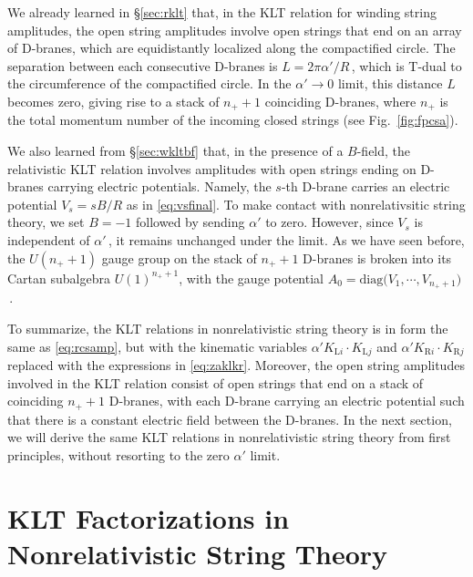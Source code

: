 \documentclass[11pt]{article}
\begin{document}
We already learned in \S\ref{sec:rklt} that, in the KLT relation for winding string amplitudes, the open string amplitudes involve open strings that end on an array of D-branes, which are equidistantly localized along the compactified circle. The separation between each consecutive D-branes is $L = 2 \pi \alpha' / R$\,, which is T-dual to the circumference of the compactified circle. In the $\alpha' \rightarrow 0$ limit, this distance $L$ becomes zero, giving rise to a stack of $n_+ + 1$ coinciding D-branes, where $n_+$ is the total momentum number of the incoming closed strings (see Fig.~\ref{fig:fpcsa}). 

We also learned from \S\ref{sec:wkltbf} that, in the presence of a $B$-field, the relativistic KLT relation involves amplitudes with open strings ending on D-branes carrying electric potentials. Namely, the $s$-th D-brane carries an electric potential $V_s = s B / R$ as in \eqref{eq:vsfinal}. 
%
To make contact with nonrelativsitic string theory, we set $B = -1$ followed by sending $\alpha'$ to zero. However, since $V_s$ is independent of $\alpha'$\,, it remains unchanged under the limit. As we have seen before, the $U(n_++1)$ gauge group on the stack of $n_++1$ D-branes is broken into its Cartan subalgebra $U(1)^{n_+ + 1}$, with the gauge potential $A_0 = \text{diag} \bigl( V_1, \cdots, V_{n_++1} \bigr)$\,.

To summarize, the KLT relations in nonrelativistic string theory is in form the same as \eqref{eq:rcsamp}, but with the kinematic variables $\alpha' K_{\text{L}i} \cdot K_{\text{L}j}$ and $\alpha' K_{\text{R}i} \cdot K_{\text{R}j}$ replaced with the expressions in \eqref{eq:zaklkr}. Moreover, the open string amplitudes involved in the KLT relation consist of open strings that end on a stack of coinciding $n_+ + 1$ D-branes, with each D-brane carrying an electric potential such that there is a constant electric field between the D-branes. In the next section, we will derive the same KLT relations in nonrelativistic string theory from first principles, without resorting to the zero $\alpha'$ limit.



\section{KLT Factorizations in Nonrelativistic String Theory} \label{sec:kltfnsa}
\end{document}
